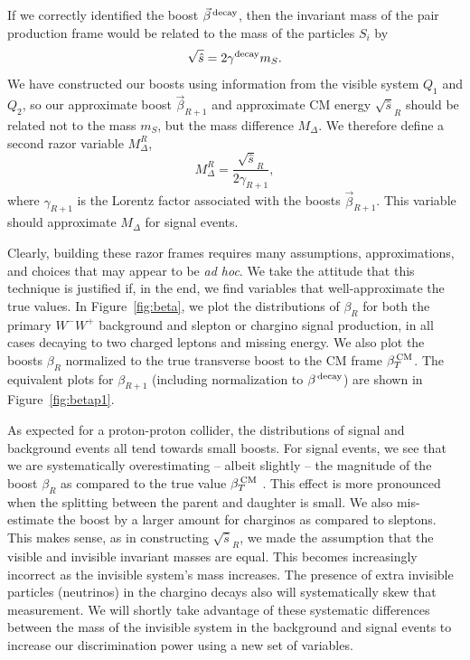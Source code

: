 If we correctly identified the boost $\vec{\beta}^{\, \rm decay}$, then the invariant mass of the pair production frame would be related to the mass of the particles $S_i$ by
\begin{equation}
\sqrt{\hat{s}} = 2 \gamma^{\rm decay}m_S.
\end{equation}
We have constructed our boosts using information from the visible system $Q_1$ and $Q_2$, so our approximate boost $\vec{\beta}_{R+1}$ and approximate CM energy $\sqrt{\hat{s}}_R$ should be related not to the mass $m_S$, but the mass difference $M_\Delta$. We therefore define a second razor variable $M_\Delta^R$,
\begin{equation}
M_\Delta^R = \frac{\sqrt{\hat{s}}_R}{2\gamma_{R+1}}, \label{eq:mdeltaR}
\end{equation}
where $\gamma_{R+1}$ is the Lorentz factor associated with the boosts $\vec{\beta}_{R+1}$. This variable should approximate $M_\Delta$ for signal events.

Clearly, building these razor frames requires many assumptions, approximations, and choices that may appear to be {\it ad hoc}. We take the attitude that this technique is justified if, in the end, we find variables that well-approximate the true  values.  In Figure~\ref{fig:beta}, we plot the distributions of $\beta_R$ for both the primary $W^-W^+$ background and slepton or chargino signal production, in all cases decaying to two charged leptons and missing energy. We also plot the boosts $\beta_R$ normalized to the true transverse boost to the CM frame $\beta^{\, \rm CM}_T$.  The equivalent plots for $\beta_{R+1}$ (including normalization to $\beta^{\, \rm decay}$) are shown in Figure~\ref{fig:betap1}.

As expected for a proton-proton collider, the distributions of signal and background events all tend towards small boosts. For signal events, we see that we are systematically overestimating -- albeit slightly -- the magnitude of the boost $\beta_R$ as compared to the true value $\beta^{\, \rm CM}_T$ . This effect is more pronounced when the splitting between the parent and daughter is small. We also mis-estimate the boost by a larger amount for charginos as compared to sleptons. This makes sense, as in constructing $\sqrt{\hat{s}}_R$, we made the assumption that the visible and invisible invariant masses are equal. This becomes increasingly incorrect as the invisible system's mass increases. The presence of extra invisible particles (neutrinos) in the chargino decays also will systematically skew that measurement. We will shortly take advantage of these systematic differences between the mass of the invisible system in the background and signal events to increase our discrimination power using a new set of variables. 

